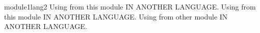 \begin{mhmodnl}[creators=marian]{module1}{lang2}
    Using  from this module IN ANOTHER LANGUAGE.
    Using  from this module IN ANOTHER LANGUAGE.
    Using  from other module IN ANOTHER LANGUAGE.
\end{mhmodnl}